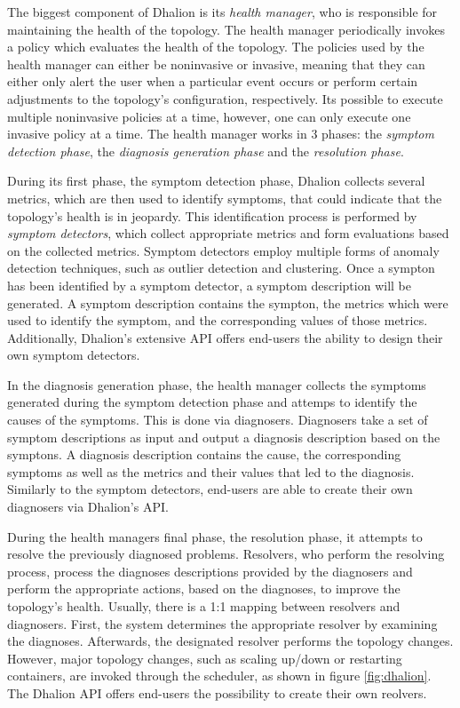         \quad The biggest component of Dhalion is its \textit{health manager}, who is responsible for maintaining the health of the topology.
        The health manager periodically invokes a policy which evaluates the health of the topology. 
        The policies used by the health manager can either be noninvasive or invasive, meaning that they can either only alert the user when a particular event occurs or 
        perform certain adjustments to the topology's configuration, respectively.
        Its possible to execute multiple noninvasive policies at a time, however, one can only execute one invasive policy at a time.
        The health manager works in 3 phases: the \textit{symptom detection phase}, the \textit{diagnosis generation phase} and the \textit{resolution phase}.
        
        \quad During its first phase, the symptom detection phase, Dhalion collects several metrics, which are then used to identify symptoms, that could indicate that the 
        topology's health is in jeopardy.
        This identification process is performed by \textit{symptom detectors}, which collect appropriate metrics and form evaluations based on the collected metrics.
        Symptom detectors employ multiple forms of anomaly detection techniques, such as outlier detection and clustering.
        Once a sympton has been identified by a symptom detector, a symptom description will be generated. A symptom description contains the sympton, the metrics which
        were used to identify the symptom, and the corresponding values of those metrics.
        Additionally, Dhalion's extensive API offers end-users the ability to design their own symptom detectors.
        
        \quad In the diagnosis generation phase, the health manager collects the symptoms generated during the symptom detection phase and attemps to identify the causes 
        of the symptoms. 
        This is done via diagnosers. Diagnosers take a set of symptom descriptions as input and output a diagnosis description based on the symptons. 
        A diagnosis description contains the cause, the corresponding symptoms as well as the metrics and their values that led to the diagnosis.
        Similarly to the symptom detectors, end-users are able to create their own diagnosers via Dhalion's API.

        \quad During the health managers final phase, the resolution phase, it attempts to resolve the previously diagnosed problems.
        Resolvers, who perform the resolving process, process the diagnoses descriptions provided by the diagnosers and perform the 
        appropriate actions, based on the diagnoses, to improve the topology's health. Usually, there is a 1:1 mapping between resolvers and diagnosers.
        First, the system determines the appropriate resolver by examining the diagnoses. Afterwards, the designated resolver performs the topology changes.
        However, major topology changes, such as scaling up/down or restarting containers, are invoked through the scheduler, as shown in figure \ref{fig:dhalion}.
        The Dhalion API offers end-users the possibility to create their own reolvers.

